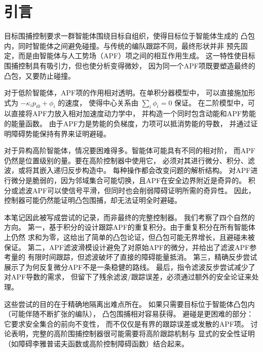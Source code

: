\section{引言}

目标围捕控制要求一群智能体围绕目标自组织，使得目标位于智能体生成的
凸包内，同时智能体之间避免碰撞。与传统的编队跟踪不同，最终形状并非
预先固定，而是由智能体与人工势场（APF）项之间的相互作用生成。
这一特性使目标围捕控制具有吸引力，但也使分析变得微妙，
因为同一个APF项既要塑造最终的凸包，又要防止碰撞。

对于低阶智能体，APF项的作用相对透明。在单积分器模型中，
可以直接施加形式为 $-\kappa_i p_{i0}+\phi_i$ 的速度，
使得中心关系由 $\sum_i\phi_i=0$ 保证。
在二阶模型中，可以直接将APF力放入相对加速度动力学中，
并构造一个同时包含动能和APF势能的能量函数。
由于APF力是势能的负梯度，力项可以抵消势能的导数，
并通过证明障碍势能保持有界来证明避碰。

对于异构高阶智能体，情况要困难得多。智能体可能具有不同的相对阶，
而APF仍然是位置级别的量。要在高阶控制器中使用它，
必须对其进行微分、积分、滤波，或将其嵌入递归反步构造中。
每种操作都会改变问题的解析结构。
对APF进行微分是脆弱的，因为邻域集合可能切换，且APF在安全边界附近是奇异的。
积分或滤波APF可以使信号平滑，但同时也会削弱障碍证明所需的奇异性。
因此，控制器可能仍然能证明凸包围捕，却无法证明全时避碰。

本笔记因此被写成尝试的记录，而非最终的完整控制器。
我们考察了四个自然的方向。
第一，基于积分的设计跟踪APF的重复积分。由于重复积分在所有智能体上仍然
求和为零，这给出了简单的凸包论证，但凸包可能无界增长，且避碰未被保证。
第二，APF滤波滑模设计避免了对原始APF的微分，并给出了滤波APF参考量的
有限时间跟踪，但滤波破坏了直接的障碍能量抵消。
第三，精确反步尝试展示了为何反复微分APF不是一条稳健的路线。
最后，指令滤波反步尝试减少了对APF导数的需求，
但留下了残余滤波/跟踪误差，必须通过额外的安全论证来处理。

这些尝试的目的在于精确地隔离出难点所在。
如果只需要目标位于智能体凸包内（可能伴随不断扩张的编队），
凸包围捕相对容易获得。
避碰是更困难的部分：它要求安全集合的前向不变性，
而不仅仅是有界的跟踪误差或发散的APF项。
讨论表明，完整的高阶围捕控制器很可能需要将高阶跟踪机制与
显式的安全性证明（如障碍李雅普诺夫函数或高阶控制障碍函数）结合起来。